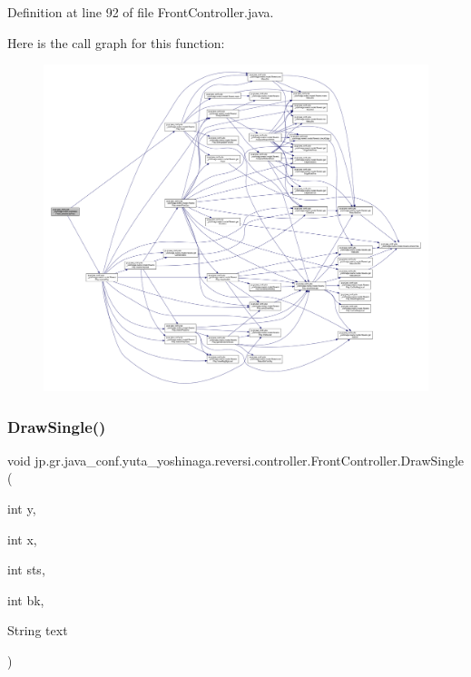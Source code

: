 Definition at line 92 of file Front\+Controller.\+java.

Here is the call graph for this function\+:
\nopagebreak
\begin{figure}[H]
\begin{center}
\leavevmode
\includegraphics[width=350pt]{classjp_1_1gr_1_1java__conf_1_1yuta__yoshinaga_1_1reversi_1_1controller_1_1_front_controller_a2f0d63da6e6fc17d2ecf2695af6f8d99_cgraph}
\end{center}
\end{figure}
\mbox{\label{classjp_1_1gr_1_1java__conf_1_1yuta__yoshinaga_1_1reversi_1_1controller_1_1_front_controller_acf079ebc5949ce36b15c56158c9b9cfa}} 
\subsubsection{\texorpdfstring{Draw\+Single()}{DrawSingle()}}
{\footnotesize\ttfamily void jp.\+gr.\+java\+\_\+conf.\+yuta\+\_\+yoshinaga.\+reversi.\+controller.\+Front\+Controller.\+Draw\+Single (\begin{DoxyParamCaption}\item[{int}]{y,  }\item[{int}]{x,  }\item[{int}]{sts,  }\item[{int}]{bk,  }\item[{String}]{text }\end{DoxyParamCaption})}



